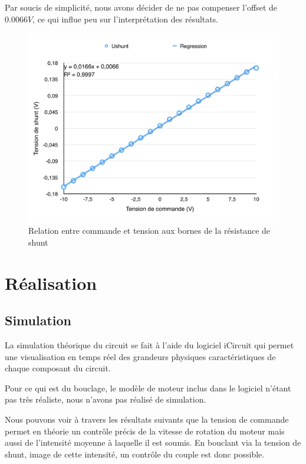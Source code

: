 \documentclass[a4paper]{article}
\begin{document}
Par soucis de simplicité, nous avons décider de ne pas compenser l'offset de $0.0066V$, ce qui influe peu sur l'interprétation des résultats.


\begin{figure}[H]
	\centering
	\includegraphics[width=1\textwidth]{graph_shunt.png}
	\caption{Relation entre commande et tension aux bornes de la résistance de shunt}
\end{figure}



\section{Réalisation}

\subsection{Simulation}

La simulation théorique du circuit se fait à l'aide du logiciel iCircuit qui permet une visualisation en temps réel des grandeurs physiques caractéristiques de chaque composant du circuit.

Pour ce qui est du bouclage, le modèle de moteur inclus dans le logiciel n'étant pas très réaliste, nous n'avons pas réalisé de simulation.

Nous pouvons voir à travers les résultats suivants que la tension de commande permet en théorie un contrôle précis de la vitesse de rotation du moteur mais aussi de l'intensité moyenne à laquelle il est soumis. En bouclant via la tension de shunt, image de cette intensité, un contrôle du couple est donc possible.
\end{document}
